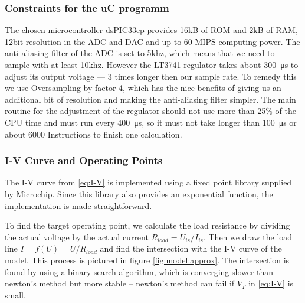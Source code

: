 

\subsubsection{Constraints for the uC programm}

The chosen  microcontroller dsPIC33ep  provides 16kB  of ROM  and 2kB  of RAM,
12bit resolution  in the ADC  and DAC and up  to 60 MIPS  computing power. The
anti-aliasing filter  of the  ADC is  set to  5khz, which  means that  we need
to  sample with  at  least  10khz. However the  LT3741  regulator takes  about
\SI{300}{\micro\second} to adjust  its output voltage --- 3  times longer then
our  sample rate. To  remedy  this  we use  Oversampling  by  factor 4,  which
has  the nice  benefits  of giving  us  an additional  bit  of resolution  and
making the anti-aliasing  filter simpler. The main routine  for the adjustment
of  the  regulator  should  not  use  more  than  25\%  of  the  CPU  time  and
must  run every  \SI{400}{\micro\second},  so  it must  not  take longer  than
\SI{100}{\micro\second} or about 6000 Instructions to finish one calculation.


\subsubsection{I-V Curve and Operating Points}
\label{subsec:iv-curve-operating-points}

The  I-V  curve  from  \eqref{eq:I-V} is implemented using a fixed point  library
supplied by Microchip. Since this library also provides an exponential function,
the implementation is made straightforward.

To  find the  target  operating point,  we calculate  the  load resistance  by
dividing  the actual  voltage  by  the actual  current  $R_{load}  = U_{is}  /
I_{is}$. Then we  draw the load line  $I = f(U) =  U / R_{load}$ and  find the
intersection with  the I-V curve  of the model.   This process is  pictured in
figure \ref{fig:model:approx}.   The intersection is  found by using  a binary
search algorithm,  which is  converging slower than  newton's method  but more
stable -- newton's method can fail if $V_T$ in \eqref{eq:I-V} is small.

